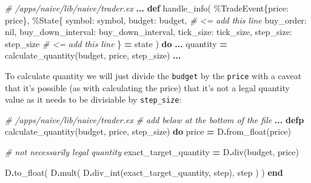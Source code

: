 \documentclass[
  oneside]{book}
\newenvironment{Shaded}{\begin{snugshade}}{\end{snugshade}}
\newcommand{\CommentTok}[1]{\textcolor[rgb]{0.56,0.35,0.01}{\textit{#1}}}
\newcommand{\ConstantTok}[1]{\textcolor[rgb]{0.00,0.00,0.00}{#1}}
\newcommand{\KeywordTok}[1]{\textcolor[rgb]{0.13,0.29,0.53}{\textbf{#1}}}
\newcommand{\NormalTok}[1]{#1}
\newcommand{\OperatorTok}[1]{\textcolor[rgb]{0.81,0.36,0.00}{\textbf{#1}}}
\newcommand{\VariableTok}[1]{\textcolor[rgb]{0.00,0.00,0.00}{#1}}
\begin{document}
\begin{Shaded}
\begin{Highlighting}[]
  \CommentTok{\# /apps/naive/lib/naive/trader.ex}
  \OperatorTok{...}
  \KeywordTok{def}\NormalTok{ handle\_info(}
\NormalTok{        \%}\ConstantTok{TradeEvent}\NormalTok{\{}\VariableTok{price:}\NormalTok{ price\},}
\NormalTok{        \%}\ConstantTok{State}\NormalTok{\{}
          \VariableTok{symbol:}\NormalTok{ symbol,}
          \VariableTok{budget:}\NormalTok{ budget, }\CommentTok{\# \textless{}= add this line}
          \VariableTok{buy\_order:} \ConstantTok{nil}\NormalTok{,}
          \VariableTok{buy\_down\_interval:}\NormalTok{ buy\_down\_interval,}
          \VariableTok{tick\_size:}\NormalTok{ tick\_size,}
          \VariableTok{step\_size:}\NormalTok{ step\_size }\CommentTok{\# \textless{}= add this line}
\NormalTok{        \} }\OperatorTok{=}\NormalTok{ state}
\NormalTok{      ) }\KeywordTok{do}
    \OperatorTok{...}
\NormalTok{    quantity }\OperatorTok{=}\NormalTok{ calculate\_quantity(budget, price, step\_size)}
    \OperatorTok{...}
\end{Highlighting}
\end{Shaded}

To calculate quantity we will just divide the \texttt{budget} by the \texttt{price} with a caveat that it's possible (as with calculating the price) that it's not a legal quantity value as it needs to be divisiable by \texttt{step\_size}:

\begin{Shaded}
\begin{Highlighting}[]
  \CommentTok{\# /apps/naive/lib/naive/trader.ex}
  \CommentTok{\# add below at the bottom of the file}
  \OperatorTok{...}
  \KeywordTok{defp}\NormalTok{ calculate\_quantity(budget, price, step\_size) }\KeywordTok{do}
\NormalTok{    price }\OperatorTok{=}\NormalTok{ D}\OperatorTok{.}\NormalTok{from\_float(price)}

    \CommentTok{\# not necessarily legal quantity}
\NormalTok{    exact\_target\_quantity }\OperatorTok{=}\NormalTok{ D}\OperatorTok{.}\NormalTok{div(budget, price)}

\NormalTok{    D}\OperatorTok{.}\NormalTok{to\_float(}
\NormalTok{      D}\OperatorTok{.}\NormalTok{mult(}
\NormalTok{        D}\OperatorTok{.}\NormalTok{div\_int(exact\_target\_quantity, step),}
\NormalTok{        step}
\NormalTok{      )}
\NormalTok{    )}
  \KeywordTok{end}
\end{Highlighting}
\end{Shaded}
\end{document}
